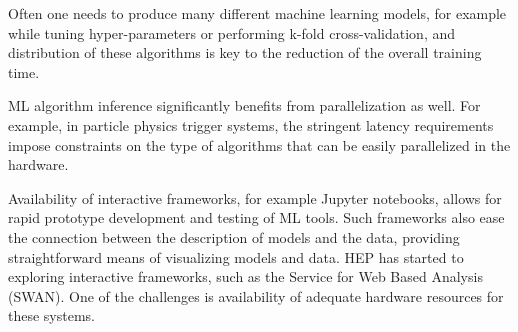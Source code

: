 Often one needs to produce many different machine learning models, for example while tuning hyper-parameters or performing k-fold cross-validation, and distribution of these algorithms is key to the reduction of the overall training time.

ML algorithm inference significantly benefits from parallelization as well. For example, in particle physics trigger systems, the stringent latency requirements impose constraints on the type of algorithms that can be easily parallelized in the hardware.

Availability of interactive frameworks, for example Jupyter notebooks, allows for rapid prototype development and testing of ML tools. Such frameworks also ease the connection between the description of models and the data, providing straightforward means of visualizing models and data.
HEP has started to exploring interactive frameworks, such as the Service for Web Based Analysis (SWAN). One of the challenges is availability of adequate hardware resources for these systems.







